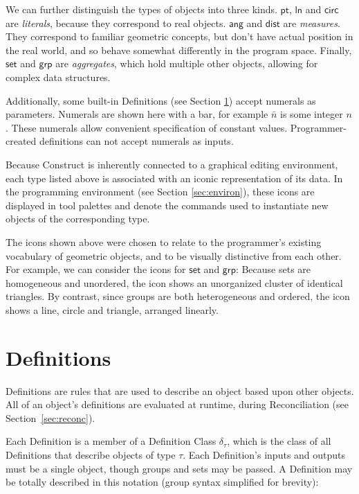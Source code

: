 \documentclass[twoside,openright,11pt]{report}
\begin{document}
We can further distinguish the types of objects into three kinds. 
$\mathsf{pt}$, $\mathsf{ln}$ and $\mathsf{circ}$ are {\it literals}, because they correspond to real objects. 
$\mathsf{ang}$ and $\mathsf{dist}$ are {\it measures}. 
They correspond to familiar geometric concepts, but don't have actual position in the real world, and so behave somewhat differently in the program space. 
Finally, $\mathsf{set}$ and $\mathsf{grp}$ are {\it aggregates}, which hold multiple other objects, allowing for complex data structures.

Additionally, some built-in Definitions (see Section \ref{sec:def}) accept numerals as parameters. 
Numerals are shown here with a bar, for example $\bar{n}$ is some integer $n$.
These numerals allow convenient specification of constant values. 
Programmer-created definitions can not accept numerals as inputs. 

Because Construct is inherently connected to a graphical editing environment, each type listed above is associated with an iconic representation of its data.
In the programming environment (see Section \ref{sec:environ}), these icons are displayed in tool palettes and denote the commands used to instantiate new objects of the corresponding type.

The icons shown above were chosen to relate to the programmer's existing vocabulary of geometric objects, and to be visually distinctive from each other. 
For example, we can consider the icons for $\mathsf{set}$ and $\mathsf{grp}$: Because sets are homogeneous and unordered, the icon shows an unorganized cluster of identical triangles. 
By contrast, since groups are both heterogeneous and ordered, the icon shows a line, circle and triangle, arranged linearly.

\section{Definitions}
\label{sec:def}

Definitions are rules that are used to describe an object based upon other objects. 
All of an object's definitions are evaluated at runtime, during Reconciliation (see Section~\ref{sec:reconc}). 

Each Definition is a member of a Definition Class $\delta_\tau$, which is the class of all Definitions that describe objects of type $\tau$. 
Each Definition's inputs and outputs must be a single object, though groups and sets may be passed.
A Definition may be totally described in this notation (group syntax simplified for brevity): 
\end{document}

